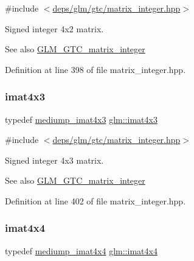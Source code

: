 {\ttfamily \#include $<$\hyperlink{matrix__integer_8hpp}{deps/glm/gtc/matrix\+\_\+integer.\+hpp}$>$}

Signed integer 4x2 matrix. \begin{DoxySeeAlso}{See also}
\hyperlink{group__gtc__matrix__integer}{G\+L\+M\+\_\+\+G\+T\+C\+\_\+matrix\+\_\+integer} 
\end{DoxySeeAlso}


Definition at line 398 of file matrix\+\_\+integer.\+hpp.

\mbox{\label{group__gtc__matrix__integer_gaa4cca8e80c0603239eda452860063844}} 
\subsubsection{\texorpdfstring{imat4x3}{imat4x3}}
{\footnotesize\ttfamily typedef \hyperlink{group__gtc__matrix__integer_ga213644b63e6ee8ac783fd9a75e3c5abb}{mediump\+\_\+imat4x3} \hyperlink{group__gtc__matrix__integer_gaa4cca8e80c0603239eda452860063844}{glm\+::imat4x3}}



{\ttfamily \#include $<$\hyperlink{matrix__integer_8hpp}{deps/glm/gtc/matrix\+\_\+integer.\+hpp}$>$}

Signed integer 4x3 matrix. \begin{DoxySeeAlso}{See also}
\hyperlink{group__gtc__matrix__integer}{G\+L\+M\+\_\+\+G\+T\+C\+\_\+matrix\+\_\+integer} 
\end{DoxySeeAlso}


Definition at line 402 of file matrix\+\_\+integer.\+hpp.

\mbox{\label{group__gtc__matrix__integer_ga367d8d5281ff82f1215a227dd2ea5ba9}} 
\subsubsection{\texorpdfstring{imat4x4}{imat4x4}}
{\footnotesize\ttfamily typedef \hyperlink{group__gtc__matrix__integer_gaf45ac606a3fb21f46228524d1d322eb2}{mediump\+\_\+imat4x4} \hyperlink{group__gtc__matrix__integer_ga367d8d5281ff82f1215a227dd2ea5ba9}{glm\+::imat4x4}}



